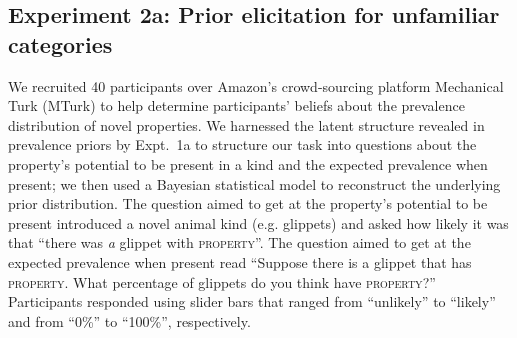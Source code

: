 \documentclass{pnastwo}
\begin{document}
\begin{article}
\begin{materials}
\subsection{Experiment 2a: Prior elicitation for unfamiliar categories}
We recruited 40 participants over Amazon's crowd-sourcing platform Mechanical Turk (MTurk) to help determine participants' beliefs about the prevalence distribution of novel properties.
We harnessed the latent structure revealed in prevalence priors by Expt.~1a to structure our task into questions about the property's potential to be present in a kind and the expected prevalence when present; we then used a Bayesian statistical model to reconstruct the underlying prior distribution. 
The question aimed to get at the property's potential to be present introduced a novel animal kind (e.g. glippets) and asked how likely it was that  ``there was \emph{a} glippet with \textsc{property}''.
The question aimed to get at the expected prevalence when present read ``Suppose there is a glippet that has \textsc{property}. What percentage of glippets do you think have \textsc{property}?'' 
Participants responded using slider bars that ranged from  ``unlikely'' to ``likely'' and from ``0\%'' to ``100\%'', respectively.

\end{materials}
\end{article}
\end{document}
